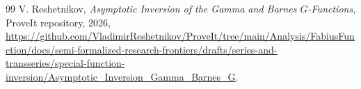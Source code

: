 \documentclass[11pt,oneside]{article}
\theoremstyle{plain}
\theoremstyle{definition}
\theoremstyle{remark}
\begin{document}
\begin{thebibliography}{99}
V. Reshetnikov,
\newblock \emph{Asymptotic Inversion of the Gamma and Barnes \(G\)-Functions},
ProveIt repository, 2026,
\newblock \url{https://github.com/VladimirReshetnikov/ProveIt/tree/main/Analysis/FabiusFunction/docs/semi-formalized-research-frontiers/drafts/series-and-transseries/special-function-inversion/Asymptotic_Inversion_Gamma_Barnes_G}.

\end{thebibliography}
\end{document}
